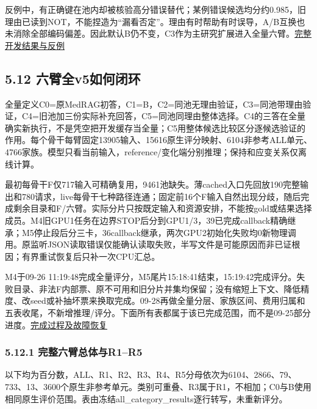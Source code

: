 \documentclass[
  11pt,
  a4paper,
]{article}
\begin{document}
反例中，有正确键在池内却被核验高分错误替代；某例错误候选均分约0.985，旧理由已读到NOT，不能捏造为``漏看否定''。理由有时帮助有时误导，A/B互换也未消除全部编码偏差。因此默认B仍不变，C3作为主研究扩展进入全量六臂。\href{https://github.com/xiotakut/cf_mrg/blob/main/papers/2026-10-02_cf_moa/author_dossier/records/research/cf_moa_experiment_report.md\#L1626}{完整开发结果与反例}

\subsection{5.12
六臂全v5如何闭环}\label{ux516dux81c2ux5168v5ux5982ux4f55ux95edux73af}

全量定义C0=原MedRAG初答，C1=B，C2=同池无理由验证，C3=同池带理由验证，C4=旧池加三份实际补充回答，C5=同池同理由整体选择。C4的三答在全量确实新执行，不是凭空把开发缓存当全量；C5用整体候选比较区分逐候选验证的作用。每个骨干每臂固定13905输入、15616原生评分映射、6104非参考ALL单元、4766家族。模型只看当前输入，reference/变化端分别推理；保持和应变关系仅离线计算。

最初每骨干F仅717输入可精确复用，9461池缺失。薄cached入口先回放190完整输出和780请求，live每骨干七种路径连通；固定前16个F输入自然出现分歧，随后完成剩余目录和F/六臂。实际分片只按既定输入和资源安排，不能按gold或结果选择成员。M4旧GPU1任务在边界STOP后分到GPU1/3，39已完成callback精确继承；M5停止段后分三卡，36callback继承，两次GPU2初始化失败均0新物理调用。原监听JSON读取错误仅能确认读取失败，半写文件是可能原因而非已证根因；有界重试恢复后只补一次CPU汇总。

M4于09-26
11:19:48完成全量评分，M5尾片15:18:41结束，15:19:42完成评分。失败目录、非法F内部票、原不可用和旧分片并集均保留；没有缩短上下文、降低精度、改seed或补抽坏票来换取完成。09-28再做全量分层、家族区间、费用归属和五表收尾，不新增推理/评分。下面所有表都属于该已完成范围，而不是09-25部分进度。\href{https://github.com/xiotakut/cf_mrg/blob/main/papers/2026-10-02_cf_moa/author_dossier/records/research/cf_moa_experiment_report.md\#L1930}{完成过程及故障恢复}

\subsubsection{5.12.1
完整六臂总体与R1--R5}\label{ux5b8cux6574ux516dux81c2ux603bux4f53ux4e0er1r5}

以下均为百分数，ALL、R1、R2、R3、R4、R5分母依次为6104、2866、79、733、13、3600个原生非参考单元。类别可重叠、R3属于R1，不相加；C0与B使用相同原生评价范围。表由冻结all\_category\_results逐行转写，未重新评分。
\end{document}
